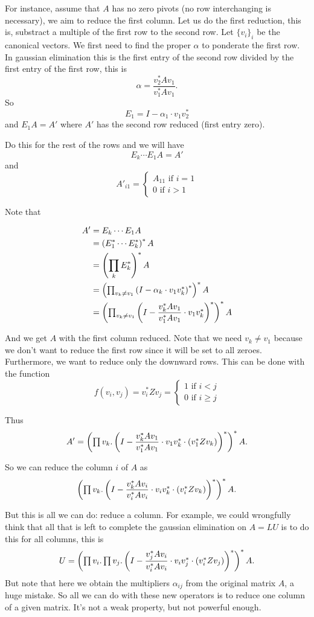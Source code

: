 For instance, assume that $A$ has no zero pivots (no row interchanging is necessary), we aim to reduce the first column. Let us do the first reduction, this is, substract a multiple of the first row to the second row. Let $\lbrace v_i\rbrace_i$ be the canonical vectors. We first need to find the proper $\alpha$ to ponderate the first row. In gaussian elimination this is the first entry of the second row divided by the first entry of the first row, this is $$\alpha = \dfrac{v_2^*Av_1}{v_1^*Av_1}.$$
So $$E_1= I - \alpha_1\cdot v_1v_2^*$$
and $E_1A=A'$ where $A'$ has the second row reduced (first entry zero).

Do this for the rest of the rows and we will have $$E_k\cdots E_1A=A'$$ and
\[
  			A'_{i1}=\begin{cases}
               A_{11} \text{ if } i =1 \\
               0 \text{ if } i > 1
            \end{cases}
		\]

Note that

\begin{align*}
A'&=E_k\cdots E_1A \\
&=\left( E_1^*\cdots E_k^*\right)^*A \\
&=\left(\prod_{k}E_k^*\right)^*A \\
&=\left(\textstyle\prod_{v_k\neq v_1}\left(I-\alpha_k\cdot v_1v_k^*\right)^*\right)^*A \\
&=\left(\textstyle\prod_{v_k\neq v_1}\left(I-\dfrac{v_k^*Av_1}{v_1^*Av_1}\cdot v_1v_k^*\right)^*\right)^*A
\end{align*}

And we get $A$ with the first column reduced. Note that we need $v_k\neq v_1$ because we don't want to reduce the first row since it will be set to all zeroes. Furthermore, we want to reduce only the downward rows. This can be done with the function 
\[
  			f(v_i, v_j)=v_i^*Zv_j=\begin{cases}
               1 \text{ if } i < j \\
               0 \text{ if } i \geq j
            \end{cases}
		\]

Thus $$A'=\left(\textstyle\prod v_k.\left(I-\dfrac{v_k^*Av_1}{v_1^*Av_1}\cdot v_1v_k^*\cdot\left(v_1^*Zv_k\right)\right)^*\right)^*A.$$

So we can reduce the column $i$ of $A$ as $$\left(\textstyle\prod v_k.\left(I-\dfrac{v_k^*Av_i}{v_i^*Av_i}\cdot v_iv_k^*\cdot\left(v_i^*Zv_k\right)\right)^*\right)^*A.$$

But this is all we can do: reduce a column. For example, we could wrongfully think that all that is left to complete the gaussian elimination on $A=LU$ is to do this for all columns, this is $$U=\left(\textstyle\prod v_i.\textstyle\prod v_j.\left(I-\dfrac{v_j^*Av_i}{v_i^*Av_i}\cdot v_iv_j^*\cdot\left(v_i^*Zv_j\right)\right)^*\right)^*A.$$
But note that here we obtain the multipliers $\alpha_{ij}$ from the original matrix $A$, a huge mistake. So all we can do with these new operators is to reduce one column of a given matrix. It's not a weak property, but not powerful enough.

